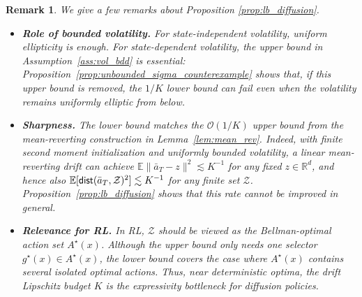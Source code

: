 \documentclass{article}
\newtheorem{rmk}[defn]{Remark}
\newcommand{\1}{\mathbbm{1}}
\newcommand{\dist}{{\sf dist}}
\numberwithin{equation}{section}
\begin{document}
\begin{rmk}
We give a few remarks about Proposition \ref{prop:lb_diffusion}.





\begin{itemize}
\item[(i)]  \textbf{Role of bounded volatility.} 
For state-independent volatility, uniform ellipticity is enough. 
For state-dependent volatility, the upper bound in Assumption~\ref{ass:vol_bdd} is essential: Proposition~\ref{prop:unbounded_sigma_counterexample} shows that, if this upper bound is removed, the \(1/K\) lower bound can fail even when the volatility remains uniformly elliptic from below.

\item[(ii)] \textbf{Sharpness.} 
The lower bound matches the \(\mathcal{O}(1/K)\) upper bound from the mean-reverting construction in Lemma~\ref{lem:mean_rev}. 
Indeed, with finite second moment initialization and uniformly bounded volatility, a linear mean-reverting drift can achieve
$\mathbb E\|\bar a_T-z\|^2 \lesssim K^{-1}$
for any fixed \(z\in\mathbb R^d\), and hence also
$ \mathbb E[\dist(\bar a_T,\mathcal Z)^2]\lesssim K^{-1}$
for any finite set \(\mathcal Z\). 
Proposition~\ref{prop:lb_diffusion} shows that this rate cannot be improved in general.

\item[(iii)] \textbf{Relevance for RL.}
In RL, \(\mathcal Z\) should be viewed as the Bellman-optimal action set \(A^\star(x)\). 
Although the upper bound only needs one selector \(g^\star(x)\in A^\star(x)\), the lower bound covers the case where \(A^\star(x)\) contains several isolated optimal actions. 
Thus, near deterministic optima, the drift Lipschitz budget \(K\) is the expressivity bottleneck for diffusion policies.
\end{itemize}
\end{rmk}
\end{document}
